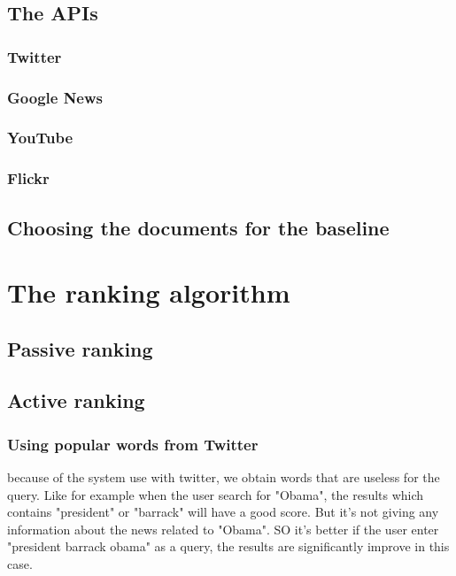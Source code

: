 \documentclass[10pt, a4paper]{article}
\begin{document}
\subsection{The APIs}

\subsubsection{Twitter}


\subsubsection{Google News}


\subsubsection{YouTube}


\subsubsection{Flickr}

\subsection{Choosing the documents for the baseline}



\section{The ranking algorithm}

\subsection{Passive ranking}


\subsection{Active ranking}

\subsubsection{Using popular words from Twitter}
because of the system use with twitter, we obtain words that are useless for the query. Like for example when the user search for "Obama", the results which contains "president" or "barrack" will have a good score. But it's not giving any information about the news related to "Obama". SO it's better if the user enter "president barrack obama" as a query, the results are significantly improve in this case.
\end{document}
